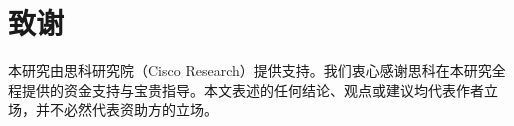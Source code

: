 \chapter{致谢}

本研究由思科研究院（Cisco Research）提供支持。我们衷心感谢思科在本研究全程提供的资金支持与宝贵指导。本文表述的任何结论、观点或建议均代表作者立场，并不必然代表资助方的立场。

